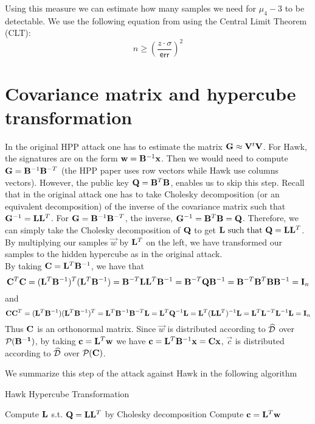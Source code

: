 {{Using this measure we can estimate how many samples we need for $\mu_4 - 3$ to be detectable.
We use the following equation from using the Central Limit Theorem (CLT): 
\[
    n \geq (\frac{z\cdot \sigma}{\mathsf{err}})^2
\]

\section{Covariance matrix and hypercube transformation}
In the original HPP attack one has to estimate the matrix $\mathbf{G} \approx \mathbf{V} ^t \mathbf{V}$.
For Hawk, the signatures are on the form $\mathbf{w} = \mathbf{B}^{-1} \mathbf{x}$. Then we would need to compute $\mathbf{G} = \mathbf{B}^{-1} \mathbf{B}^{-T}$ (the HPP paper uses row vectors while Hawk use columns vectors).
However, the public key $\mathbf{Q} = \mathbf{B}^T \mathbf{B}$, enables us to skip this step.
Recall that in the original attack one has to take Cholesky decomposition (or an equivalent decomposition) of the inverse of the covariance matrix such that $\mathbf{G}^{-1} = \mathbf{L}\mathbf{L}^T$. 
For $\mathbf{G} = \mathbf{B}^{-1} \mathbf{B}^{-T}$, the inverse,
$\mathbf{G}^{-1} = \mathbf{B}^T \mathbf{B} = \mathbf{Q}$. Therefore, we can simply take the Cholesky decomposition of $\mathbf{Q}$ to get $\mathbf{L} \text{ such that } \mathbf{Q} = \mathbf{L} \mathbf{L}^T$.
By multiplying our samples $\vec{w}$ by $\mathbf{L}^T$ on the left, we have transformed our samples to the hidden hypercube as in the original attack. \\
By taking $\mathbf{C} =  \mathbf{L}^T\mathbf{B}^{-1}$, we have that 
\[\mathbf{C}^T \mathbf{C} = (\mathbf{L}^T \mathbf{B}^{-1})^T (\mathbf{L}^T \mathbf{B}^{-1}) = \mathbf{B}^{-T} \mathbf{L} \mathbf{L}^T \mathbf{B}^{-1} = \mathbf{B}^{-T} \mathbf{Q} \mathbf{B}^{-1} = \mathbf{B}^{-T} \mathbf{B}^{T} \mathbf{B} \mathbf{B}^{-1} = \mathbf{I}_n\]
and
\[\mathbf{C}\mathbf{C}^T = (\mathbf{L}^T \mathbf{B}^{-1})(\mathbf{L}^T \mathbf{B}^{-1})^T = \mathbf{L}^T \mathbf{B}^{-1} \mathbf{B}^{-T} \mathbf{L} =  \mathbf{L}^T \mathbf{Q}^{-1} \mathbf{L} = \mathbf{L}^T (\mathbf{L} \mathbf{L}^T)^{-1} \mathbf{L} = \mathbf{L}^T \mathbf{L}^{-T} \mathbf{L}^{-1} \mathbf{L} = \mathbf{I}_n\]
Thus $\mathbf{C}$ is an orthonormal matrix.
Since $\vec{w}$ is distributed according to $\widehat{\mathcal{D}}$ over $\mathcal{P}_{}(\mathbf{\mathbf{B}^{-1}})$, by taking 
$\mathbf{c} = \mathbf{L}^{T} \mathbf{w}$ we have $\mathbf{c} = \mathbf{L}^{T} \mathbf{B}^{-1} \mathbf{x} = \mathbf{C} \mathbf{x}$, $\vec{c}$ is distributed according to $\widehat{\mathcal{D}}$ over $\mathcal{P}_{}(\mathbf{C})$.

We summarize this step of the attack against Hawk in the following algorithm

\begin{algorithm}
\caption{Hawk Hypercube Transformation}
\begin{algorithmic}[1]
    \State Compute $\mathbf{L}$ s.t. $\mathbf{Q} = \mathbf{L}\mathbf{L}^T$ \Comment by Cholesky decomposition
    \State Compute $\mathbf{c} = \mathbf{L}^T \mathbf{w}$
    \State {}
\end{algorithmic}
\end{algorithm}

}}
